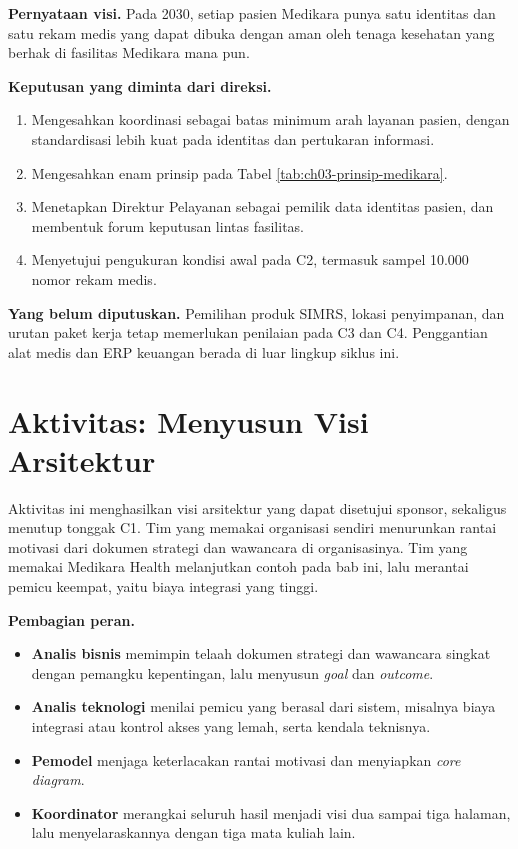 \begin{kasus}[title={Kasus Medikara Health: Ringkasan Visi Arsitektur C1}]
  \textbf{Pernyataan visi.} Pada 2030, setiap pasien Medikara punya satu identitas dan
  satu rekam medis yang dapat dibuka dengan aman oleh tenaga kesehatan yang berhak di
  fasilitas Medikara mana pun.

  \textbf{Keputusan yang diminta dari direksi.}

  \begin{enumerate}
    \item Mengesahkan koordinasi sebagai batas minimum arah layanan pasien, dengan
          standardisasi lebih kuat pada identitas dan pertukaran informasi.
    \item Mengesahkan enam prinsip pada Tabel \ref{tab:ch03-prinsip-medikara}.
    \item Menetapkan Direktur Pelayanan sebagai pemilik data identitas pasien,
          dan membentuk forum keputusan lintas fasilitas.
    \item Menyetujui pengukuran kondisi awal pada C2, termasuk sampel 10.000 nomor
          rekam medis.
  \end{enumerate}

  \textbf{Yang belum diputuskan.} Pemilihan produk SIMRS, lokasi penyimpanan, dan
  urutan paket kerja tetap memerlukan penilaian pada C3 dan C4. Penggantian alat medis
  dan ERP keuangan berada di luar lingkup siklus ini.
\end{kasus}

\section{Aktivitas: Menyusun Visi Arsitektur}

Aktivitas ini menghasilkan visi arsitektur yang dapat disetujui sponsor, sekaligus
menutup tonggak C1. Tim yang memakai organisasi sendiri menurunkan rantai motivasi
dari dokumen strategi dan wawancara di organisasinya. Tim yang memakai Medikara Health
melanjutkan contoh pada bab ini, lalu merantai pemicu keempat, yaitu biaya integrasi
yang tinggi.

\textbf{Pembagian peran.}

\begin{itemize}
  \item \textbf{Analis bisnis} memimpin telaah dokumen strategi dan wawancara singkat
        dengan pemangku kepentingan, lalu menyusun \textit{goal} dan \textit{outcome}.
  \item \textbf{Analis teknologi} menilai pemicu yang berasal dari sistem, misalnya
        biaya integrasi atau kontrol akses yang lemah, serta kendala teknisnya.
  \item \textbf{Pemodel} menjaga keterlacakan rantai motivasi dan menyiapkan
        \textit{core diagram}.
  \item \textbf{Koordinator} merangkai seluruh hasil menjadi visi dua sampai tiga
        halaman, lalu menyelaraskannya dengan tiga mata kuliah lain.
\end{itemize}

